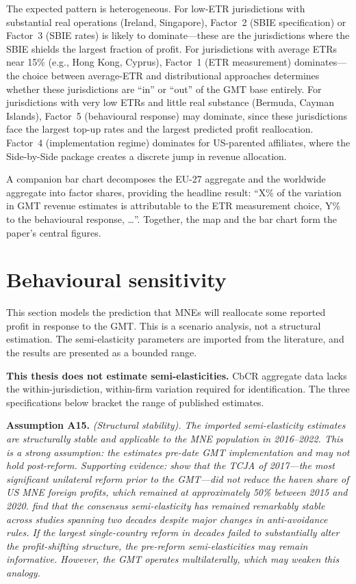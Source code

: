 \documentclass[11pt,a4paper]{article}
\newcommand{\assumption}[2]{\noindent\textbf{Assumption #1.} \textit{#2}\medskip}
\begin{document}
The expected pattern is heterogeneous. For low-ETR jurisdictions with substantial real operations (Ireland, Singapore), Factor~2 (SBIE specification) or Factor~3 (SBIE rates) is likely to dominate---these are the jurisdictions where the SBIE shields the largest fraction of profit. For jurisdictions with average ETRs near 15\% (e.g., Hong Kong, Cyprus), Factor~1 (ETR measurement) dominates---the choice between average-ETR and distributional approaches determines whether these jurisdictions are ``in'' or ``out'' of the GMT base entirely. For jurisdictions with very low ETRs and little real substance (Bermuda, Cayman Islands), Factor~5 (behavioural response) may dominate, since these jurisdictions face the largest top-up rates and the largest predicted profit reallocation. Factor~4 (implementation regime) dominates for US-parented affiliates, where the Side-by-Side package creates a discrete jump in revenue allocation.

A companion bar chart decomposes the EU-27 aggregate and the worldwide aggregate into factor shares, providing the headline result: ``X\% of the variation in GMT revenue estimates is attributable to the ETR measurement choice, Y\% to the behavioural response, \ldots''. Together, the map and the bar chart form the paper's central figures.

\section{Behavioural sensitivity}\label{sec:behavioural}

This section models the prediction that MNEs will reallocate some reported profit in response to the GMT. This is a scenario analysis, not a structural estimation. The semi-elasticity parameters are imported from the literature, and the results are presented as a bounded range.

\textbf{This thesis does not estimate semi-elasticities.} CbCR aggregate data lacks the within-jurisdiction, within-firm variation required for identification. The three specifications below bracket the range of published estimates.

\assumption{A15}{(Structural stability). The imported semi-elasticity estimates are structurally stable and applicable to the MNE population in 2016--2022. This is a strong assumption: the estimates pre-date GMT implementation and may not hold post-reform. Supporting evidence: \citet{garcia2022} show that the TCJA of 2017---the most significant unilateral reform prior to the GMT---did not reduce the haven share of US MNE foreign profits, which remained at approximately 50\% between 2015 and 2020. \citet{beer2020} find that the consensus semi-elasticity has remained remarkably stable across studies spanning two decades despite major changes in anti-avoidance rules. If the largest single-country reform in decades failed to substantially alter the profit-shifting structure, the pre-reform semi-elasticities may remain informative. However, the GMT operates multilaterally, which may weaken this analogy.}
\end{document}
